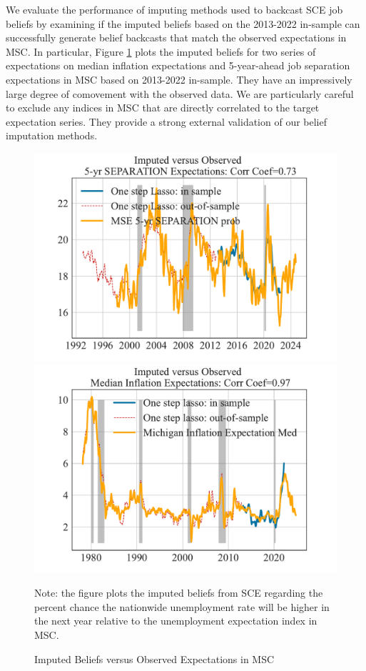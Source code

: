 We evaluate the performance of imputing methods used to backcast SCE job beliefs by examining if the imputed beliefs based on the 2013-2022 in-sample can successfully generate belief backcasts that match the observed expectations in MSC. In particular, Figure \ref{fig:impute_cv_with_msc_separation_inflation} plots the imputed beliefs for two series of expectations on median inflation expectations and 5-year-ahead job separation expectations in MSC based on 2013-2022 in-sample. They have an impressively large degree of comovement with the observed data. We are particularly careful to exclude any indices in MSC that are directly correlated to the target expectation series. They provide a strong external validation of our belief imputation methods. 

 \begin{figure}[ht]
    	\caption{Imputed Beliefs versus Observed Expectations in MSC}
    	\label{fig:impute_cv_with_msc_separation_inflation}
    	\begin{center}
\includegraphics[width=0.49\linewidth]{Figures/imputed_comparison_separation_5y_prob_msc_1step.pdf}  \includegraphics[width=0.49\linewidth]{Figures/imputed_comparison_inflation_msc_1step.pdf}  
    	\end{center}
    	
    	\begin{flushleft}Note: the figure plots the imputed beliefs from SCE regarding the percent chance the nationwide unemployment rate will be higher in the next year relative to the unemployment expectation index in MSC.\end{flushleft}
    \end{figure}



